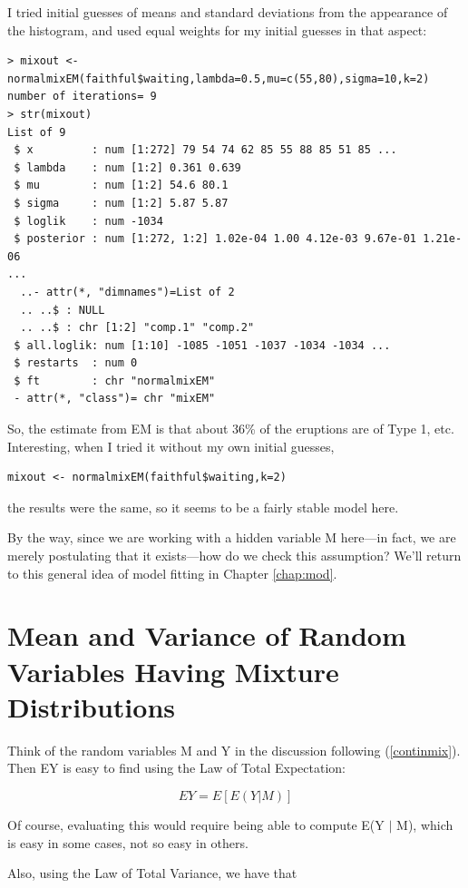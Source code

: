 I tried initial guesses of means and standard deviations from the
appearance of the histogram, and used equal weights for my initial
guesses in that aspect:

\begin{lstlisting}
> mixout <- normalmixEM(faithful$waiting,lambda=0.5,mu=c(55,80),sigma=10,k=2)
number of iterations= 9 
> str(mixout)
List of 9
 $ x         : num [1:272] 79 54 74 62 85 55 88 85 51 85 ...
 $ lambda    : num [1:2] 0.361 0.639
 $ mu        : num [1:2] 54.6 80.1
 $ sigma     : num [1:2] 5.87 5.87
 $ loglik    : num -1034
 $ posterior : num [1:272, 1:2] 1.02e-04 1.00 4.12e-03 9.67e-01 1.21e-06
...
  ..- attr(*, "dimnames")=List of 2
  .. ..$ : NULL
  .. ..$ : chr [1:2] "comp.1" "comp.2"
 $ all.loglik: num [1:10] -1085 -1051 -1037 -1034 -1034 ...
 $ restarts  : num 0
 $ ft        : chr "normalmixEM"
 - attr(*, "class")= chr "mixEM"
\end{lstlisting}

So, the estimate from EM is that about 36\% of the eruptions are of Type
1, etc.  Interesting, when I tried it without my own initial guesses,

\begin{lstlisting}
mixout <- normalmixEM(faithful$waiting,k=2)
\end{lstlisting}

the results were the same, so it seems to be a fairly stable model here.

By the way, since we are working with a hidden variable M here---in
fact, we are merely postulating that it exists---how do we check this
assumption?  We'll return to this general idea of model fitting in
Chapter \ref{chap:mod}.

\section{Mean and Variance of Random Variables Having Mixture
Distributions}
\label{mixmeanvar}

Think of the random variables M and Y in the discussion following
(\ref{continmix}).  Then EY is easy to find using the Law of Total
Expectation:

\begin{equation}
\label{mixmean}
EY = E[E(Y | M)]
\end{equation}

Of course, evaluating this would require being able to compute E(Y $|$
M), which is easy in some cases, not so easy in others.

Also, using the Law of Total Variance, we have that

